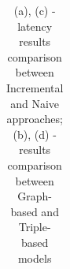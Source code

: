 \begin{table}[htbp]
{\begin{tabular}{l | ccccc}
		\hline %
	 	\end{tabular}
	}
	\caption{(a), (c) - latency results comparison between Incremental and Naive approaches; (b), (d) - results comparison between Graph-based and Triple-based models}
	\label{tab:soak_latency_comparisons}	
\end{table}

